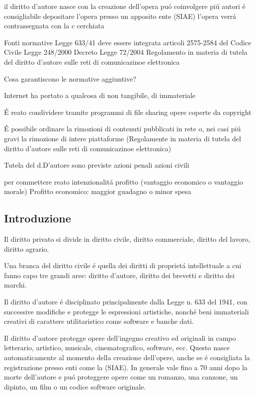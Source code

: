 \documentclass{article}
\begin{document}
il diritto d'autore nasce con la creazione dell'opera
pu\'o coinvolgere pi\'u autori
\'e consigliabile depositare l'opera presso un apposito ente (SIAE)
l'opera verr\'a contrassegnata con la c cerchiata

Fonti normative
Legge 633/41 deve essere integrata
articoli 2575-2584 del Codice Civile
Legge 248/2000
Decreto Legge 72/2004
Regolamento in materia di tutela del diritto d'autore sulle reti di comunicazinoe elettronica

Cosa garantiscono le normative aggiuntive?

Internet ha portato a qualcosa di non tangibile, di immateriale

\'E reato condividere tramite programmi di file sharing opere coperte da copyright

\'E possibile ordinare la rimozioni di contenuti pubblicati in rete o, nei casi pi\'u gravi la rimozione di intere piattaforme
(Regolamente in materia di tutela del diritto d'autore sulle reti di comunicazinoe elettronica)

Tutela del d.D'autore
sono previste
azioni penali
azioni civili

per commettere reato
intenzionalit\'a
profitto (vantaggio economico o vantaggio morale)
Profitto economico: maggior guadagno o minor spesa

\subsection{Introduzione}
Il diritto privato si divide in diritto civile, diritto commerciale, diritto del lavoro, diritto agrario.

Una branca del diritto civile \'e quella dei diritti di propriet\'a intellettuale a cui fanno capo tre grandi aree: diritto d'autore, diritto dei brevetti e diritto dei marchi.

Il diritto d'autore \'e disciplinato principalmente dalla Legge n. 633 del 1941, con successive modifiche e protegge le espressioni artistiche, nonch\'e beni immateriali creativi di carattere utilitaristico come software e banche dati.

Il diritto d'autore protegge opere dell'ingegno creativo ed originali in campo letterario, artistico, musicale, cinematografico, software, ecc. Questo nasce automaticamente al momento della creazione dell'opere, anche se \'e consigliata la registrazione presso enti come la (SIAE). In generale vale fino a 70 anni dopo la morte dell'autore e pu\'o proteggere opere come un romanzo, una canzone, un dipinto, un film o un codice software originale.
\end{document}

